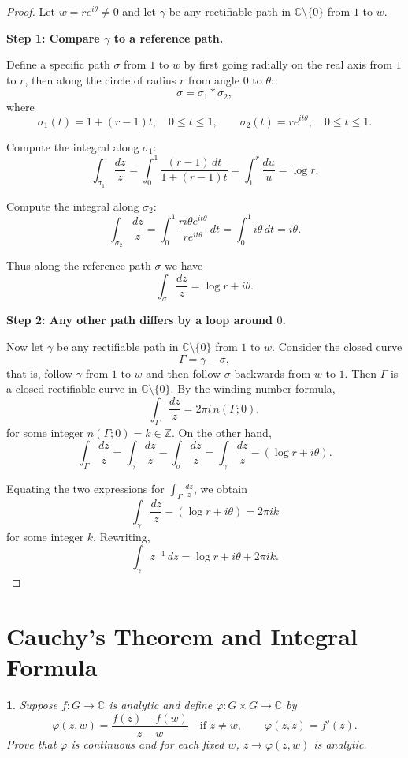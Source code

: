 \documentclass[12pt, a4paper]{report}
\theoremstyle{spaced}
\newtheorem{exercise}{}
\newcommand{\setexercise}[1]{\setcounter{exercise}{#1-1}}
\begin{document}
\begin{proof}
	Let $w = r e^{i\theta} \neq 0$ and let $\gamma$ be any rectifiable path in
	$\mathbb{C} \setminus \{0\}$ from $1$ to $w$.

	\medskip
	\noindent\textbf{Step 1: Compare $\gamma$ to a reference path.}

	Define a specific path $\sigma$ from $1$ to $w$ by first going radially on the
	real axis from $1$ to $r$, then along the circle of radius $r$ from angle $0$
	to $\theta$:
	\[
		\sigma = \sigma_1 * \sigma_2,
	\]
	where
	\[
		\sigma_1(t) = 1 + (r-1)t, \quad 0 \le t \le 1,
		\qquad
		\sigma_2(t) = r e^{it\theta}, \quad 0 \le t \le 1.
	\]

	Compute the integral along $\sigma_1$:
	\[
		\int_{\sigma_1} \frac{dz}{z}
		= \int_0^1 \frac{(r-1)\,dt}{1+(r-1)t}
		= \int_1^r \frac{du}{u}
		= \log r.
	\]

	Compute the integral along $\sigma_2$:
	\[
		\int_{\sigma_2} \frac{dz}{z}
		= \int_0^1 \frac{r i\theta e^{it\theta}}{r e^{it\theta}}\,dt
		= \int_0^1 i\theta\,dt
		= i\theta.
	\]

	Thus along the reference path $\sigma$ we have
	\[
		\int_{\sigma} \frac{dz}{z}
		= \log r + i\theta.
	\]

	\medskip
	\noindent\textbf{Step 2: Any other path differs by a loop around $0$.}

	Now let $\gamma$ be any rectifiable path in $\mathbb{C}\setminus \{0\}$ from $1$ to $w$.
	Consider the closed curve
	\[
		\Gamma = \gamma - \sigma,
	\]
	that is, follow $\gamma$ from $1$ to $w$ and then follow $\sigma$ backwards from $w$ to $1$.
	Then $\Gamma$ is a closed rectifiable curve in $\mathbb{C}\setminus \{0\}$.
	By the winding number formula,
	\[
		\int_{\Gamma} \frac{dz}{z}
		= 2\pi i\, n(\Gamma;0),
	\]
	for some integer $n(\Gamma;0) = k \in \mathbb{Z}$.
	On the other hand,
	\[
		\int_{\Gamma} \frac{dz}{z}
		= \int_{\gamma} \frac{dz}{z}
		- \int_{\sigma} \frac{dz}{z}
		= \int_{\gamma} \frac{dz}{z}
		- (\log r + i\theta).
	\]

	Equating the two expressions for $\displaystyle \int_{\Gamma} \frac{dz}{z}$, we obtain
	\[
		\int_{\gamma} \frac{dz}{z}
		- (\log r + i\theta)
		= 2\pi i k
	\]
	for some integer $k$.
	Rewriting,
	\[
		\int_{\gamma} z^{-1}\,dz
		= \log r + i\theta + 2\pi i k.
	\]
\end{proof}

\section{Cauchy's Theorem and Integral Formula}
\setexercise{1}
\begin{exercise}
	Suppose $f : G \to \mathbb{C}$ is analytic and define $\varphi : G \times G \to \mathbb{C}$ by
	\[
		\varphi(z,w) = \frac{f(z) - f(w)}{\, z - w \,} \quad \text{if } z \neq w,
		\qquad
		\varphi(z,z) = f'(z).
	\]
	Prove that $\varphi$ is continuous and for each fixed \(w\), \(z \to \varphi(z,w)\)
	is analytic.
\end{exercise}
\end{document}
